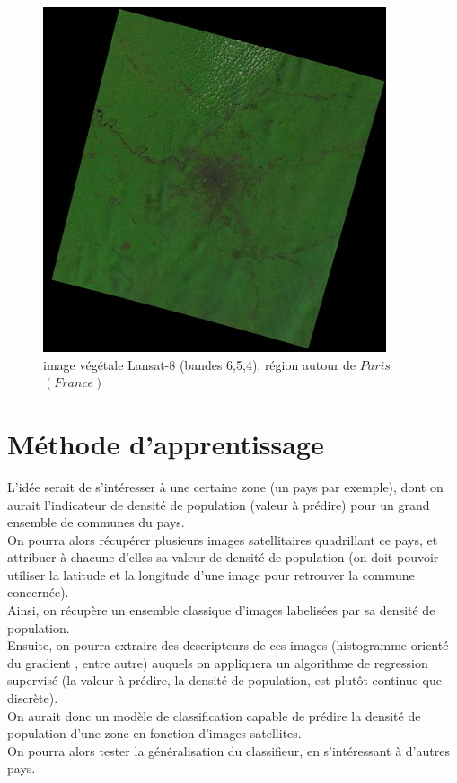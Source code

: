 \documentclass{book}
\begin{document}
\begin{figure}[H]
\begin{center}
\includegraphics[scale=0.8]{LC81990262015158LGN00_vegetal.jpg}
\end{center}
\caption{image végétale Lansat-8 (bandes 6,5,4), région autour de $Paris$ $(France)$}
\label{vegetation}
\end{figure}

\clearpage

\chapter{Méthode d'apprentissage}

L'idée serait de s'intéresser à une certaine zone (un pays par exemple), dont on aurait l'indicateur de densité de population (valeur 
à prédire) pour un grand ensemble de communes du pays.\\
On pourra alors récupérer plusieurs images satellitaires quadrillant ce pays, et attribuer à chacune d'elles
sa valeur de densité de population (on doit pouvoir utiliser la latitude et la longitude d'une image pour retrouver la commune concernée).\\
Ainsi, on récupère un ensemble classique d'images labelisées par sa densité de population.\\
Ensuite, on pourra extraire des descripteurs de ces images (histogramme orienté du gradient \cite{Dalal05histogramsof}, entre autre)
auquels on appliquera un algorithme de regression supervisé (la valeur à prédire, la densité de
population, est plut\^{o}t continue que discrète).\\
On aurait donc un modèle de classification capable de prédire la densité de population d'une zone en fonction d'images satellites.\\
On pourra alors tester la généralisation du classifieur, en s'intéressant à d'autres pays.\\
\end{document}
